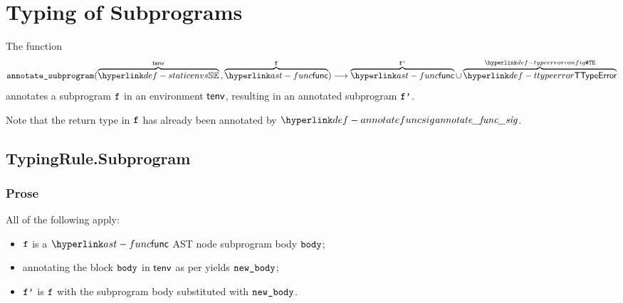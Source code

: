 \chapter{Typing of Subprograms \label{chap:TypingSubprograms}}
\hypertarget{def-annotatesubprogram}{}
The function
\[
  \annotatesubprogram{\overname{\staticenvs}{\tenv} \aslsep \overname{\func}{\vf}} \aslto \overname{\func}{\vfp}
  \cup \overname{\TTypeError}{\TypeErrorConfig}
\]
annotates a subprogram $\texttt{f}$ in an environment $\textsf{tenv}$, resulting in an annotated subprogram $\texttt{f'}$.
\ProseOtherwiseTypeError

Note that the return type in $\texttt{f}$ has already been annotated by $\annotatefuncsig$.

\section{TypingRule.Subprogram \label{sec:TypingRule.Subprogram}}

\subsection{Prose}
All of the following apply:
\begin{itemize}
  \item $\texttt{f}$ is a $\func$ AST node subprogram body $\texttt{body}$;
  \item annotating the block $\texttt{body}$ in $\textsf{tenv}$ as per  yields $\texttt{new\_body}$\ProseOrTypeError;
  \item $\texttt{f'}$ is $\texttt{f}$ with the subprogram body substituted with $\texttt{new\_body}$.
\end{itemize}


